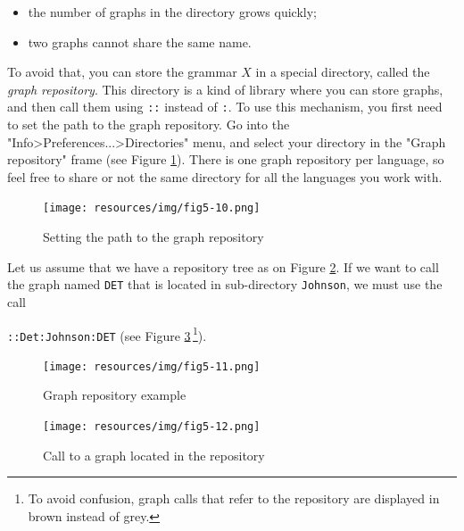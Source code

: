 \begin{itemize}
  \item the number of graphs in the directory grows quickly;
  \item two graphs cannot share the same name.
\end{itemize}

\noindent To avoid that, you can store the grammar $X$ in a special directory,
called the \textit{graph repository}. This directory is a
kind of library where you can store graphs, and then call them using \verb+::+
instead of \verb+:+. To use this mechanism, you first need to set the path to the
graph repository. Go into the "Info>Preferences...>Directories" menu, and select
your directory in the "Graph repository" frame (see Figure \ref{directories}).
There is one graph repository per language, so feel free to share or not the same
directory for all the languages you work with.

\begin{figure}[!ht]
\begin{center}
\texttt{[image: resources/img/fig5-10.png]}
\caption{Setting the path to the graph repository\label{directories}}
\end{center}
\end{figure}


\bigskip
\noindent Let us assume that we have a repository tree as on Figure
\ref{repository}. If we want to call the graph named \verb+DET+ that is located
in sub-directory \verb+Johnson+, we must use the call

\noindent \verb+::Det:Johnson:DET+
(see Figure \ref{repository-graph-call}\,\footnote{To avoid confusion, graph calls
that refer to the repository are displayed in brown instead of grey.}).


\bigskip
\begin{figure}[!ht]
\begin{center}
\texttt{[image: resources/img/fig5-11.png]}
\caption{Graph repository example\label{repository}}
\end{center}
\end{figure}

\begin{figure}[!ht]
\begin{center}
\texttt{[image: resources/img/fig5-12.png]}
\caption{Call to a graph located in the
repository\label{repository-graph-call}}
\end{center}
\end{figure}

